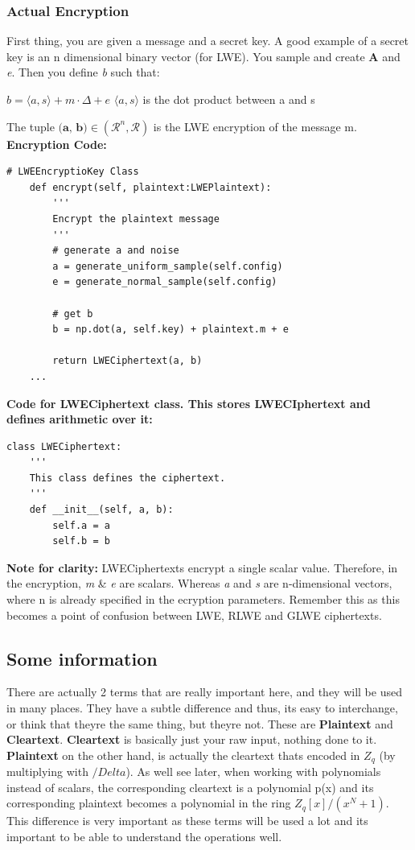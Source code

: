 \documentclass{report}
\begin{document}
\subsubsection{Actual Encryption}
First thing, you are given a message and a secret key. A good example of a secret key is an n dimensional binary vector (for LWE). You sample and create $\mathbf{A}$ and \textit{e}. Then you define \textit{b} such that:
\begin{center}
  $ b = \langle a, s \rangle + m \cdot \Delta + e $ \newline
  \small{ $ \langle a, s \rangle $ is the dot product between a and s }
\end{center}
The tuple $\textbf{(a, b)} \in (\mathcal{R}^n, \mathcal{R})$ is the LWE encryption of the message m. \newline
\textbf{Encryption Code:}
\begin{verbatim}
# LWEEncryptioKey Class
	def encrypt(self, plaintext:LWEPlaintext):
		'''
		Encrypt the plaintext message
		'''
		# generate a and noise
		a = generate_uniform_sample(self.config)
		e = generate_normal_sample(self.config)
		
		# get b
		b = np.dot(a, self.key) + plaintext.m + e 
		
		return LWECiphertext(a, b)
	...
\end{verbatim}
\textbf{Code for LWECiphertext class. This stores LWECIphertext and defines arithmetic over it:}
\begin{verbatim}
class LWECiphertext:
	'''
	This class defines the ciphertext.
	'''
	def __init__(self, a, b):
		self.a = a
		self.b = b
\end{verbatim}
\textbf{Note for clarity:} LWECiphertexts encrypt a single scalar value. Therefore, in the encryption, \textit{m} \& \textit{e} are scalars. Whereas \textit{a} and \textit{s} are n-dimensional vectors, where n is already specified in the ecryption parameters. Remember this as this becomes a point of confusion between LWE, RLWE and GLWE ciphertexts.

\subsection{Some information}
There are actually 2 terms that are really important here, and they will be used in many places. They have a subtle difference and thus, its easy to interchange, or think that theyre the same thing, but theyre not. These are \textbf{Plaintext} and \textbf{Cleartext}. \textbf{Cleartext} is basically  just your raw input, nothing done to it. \textbf{Plaintext} on the other hand, is actually the cleartext thats encoded in $Z_q$ (by multiplying with $/Delta$). As well see later, when working with polynomials instead of scalars, the corresponding cleartext is a polynomial p(x) and its corresponding plaintext becomes a polynomial in the ring $Z_q[x]/(x^N + 1)$. This difference is very important as these terms will be used a lot and its important to be able to understand the operations well.
\end{document}
